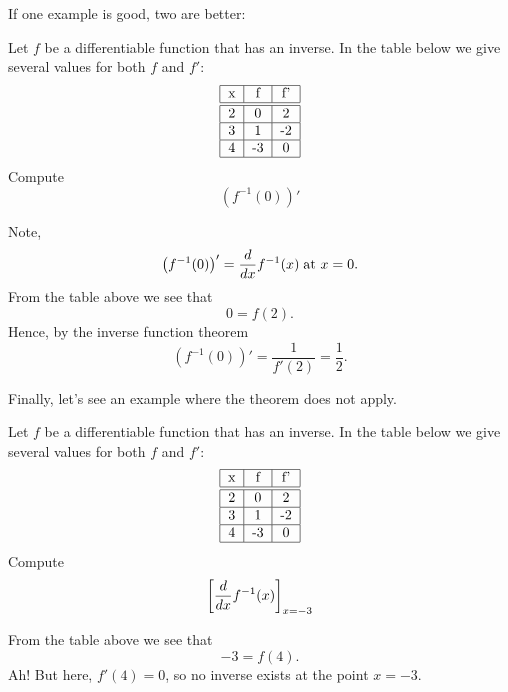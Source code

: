 \documentclass{ximera}
\begin{document}
If one example is good, two are better:

\begin{example}
  Let $f$ be a differentiable function that has an inverse. In the
  table below we give several values for both $f$ and $f'$:
  \[
  \begin{tabular}{|c|c|c|}\hline
    x & f  & f' \\ \hline \hline
    2 & 0  & 2  \\ \hline
    3 & 1  & -2 \\ \hline
    4 & -3 & 0  \\ \hline
  \end{tabular}
  \]
  Compute
  \[
  \left(f^{-1}(0)\right)'
  \]
  \begin{explanation}
    Note,
    \[
    \left(f^{-1}(0)\right)' = \frac{d}{dx} f^{-1}(x)\;\text{at $x=0$.}
    \]
    From the table above we see that
    \[
    0 = f(2).
    \]
    Hence, by the inverse function theorem
    \[
    \left(f^{-1}(0)\right)' = \frac{1}{f'(2)} = \frac{1}{2}.
    \]
  \end{explanation}
\end{example}

Finally, let's see an example where the theorem does not apply.

\begin{example}
  Let $f$ be a differentiable function that has an inverse. In the
  table below we give several values for both $f$ and $f'$:
  \[
  \begin{tabular}{|c|c|c|}\hline
    x & f  & f' \\ \hline \hline
    2 & 0  & 2  \\ \hline
    3 & 1  & -2 \\ \hline
    4 & -3 & 0  \\ \hline
  \end{tabular}
  \]
  Compute
  \[
  \bigg[ \frac{d}{dx} f^{-1}(x) \bigg]_{x=-3}
  \]
  \begin{explanation}
    From the table above we see that
    \[
    -3 = f(4).
    \]
    Ah! But here, $f'(4) = 0$, so no inverse exists at the point
    $x=-3$.
      \end{explanation}
\end{example}
\end{document}
